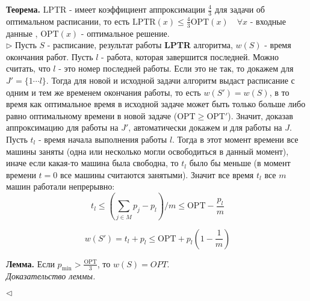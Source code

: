 \documentclass[10pt]{article}
\begin{document}
\indent \textbf{Теорема.} LPTR - имеет коэффициент аппроксимации $\frac{4}{3}$ для задачи об оптимальном расписании, 
то есть $ \text{LPTR} (x) \leq \frac{4}{3} \text{OPT} (x) \quad \forall x$ - входные данные , $\text{OPT} (x)$ - оптимальное решение. \\
\indent $\triangleright$ 
                Пусть $S$ - расписание, результат работы \textbf{LPTR} алгоритма, $w(S)$ - время окончания работ. Пусть $l$ - работа, которая завершится последней. Можно считать, что $l$ - это номер последней работы. Если это не так,
                то докажем для $J' = \{1 \cdots l\}$. Тогда для новой и исходной задачи алгоритм выдаст расписание с одним и тем же временем окончания работы, то есть $w(S') = w(S)$, в то время как оптимальное время в исходной задаче может быть только больше либо равно оптимальному времени в новой задаче ($\text{OPT} \geq \text{OPT}'$). Значит, доказав аппроксимацию для работы на $J'$, автоматически докажем и для работы на $J$. \\

                Пусть $t_l$ - время начала выполнения работы $l$. Тогда в этот момент времени все машины заняты (одна или несколько могли освободиться в данный момент), иначе если какая-то машина была свободна, то  $t_l$ было бы меньше (в момент времени $t = 0$ все машины считаются занятыми). Значит все время $t_l$ все $m$ машин работали непрерывно: 
                \begin{equation}
                    t_l \leq (\sum_{j \in M} p_j - p_l)/m \leq \text{OPT} - \frac{p_l}{m}
                \end{equation}

                \begin{equation}
                    w(S') = t_l + p_l \leq \text{OPT} + p_l (1 - \frac{1}{m}) 
                \end{equation}

                \textbf{Лемма.} Если $p_{\min} > \frac{\text{OPT}}{3}$, то $w(S) = OPT$. \\
                \indent \itshape{Доказательство леммы.} 

        $\triangleleft$
\end{document}
